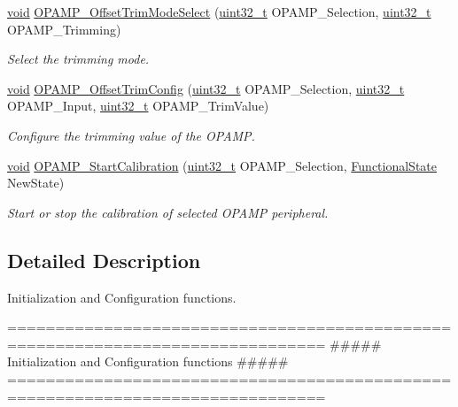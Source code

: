 \begin{DoxyCompactItemize}
\hyperlink{group___n_a_m_e_ga18028b8badbf1ea7e704ccac3c488e82}{void} \hyperlink{group___o_p_a_m_p___group1_ga3d67a254b057003e947137b48a61e2db}{O\-P\-A\-M\-P\-\_\-\-Offset\-Trim\-Mode\-Select} (\hyperlink{stdint_8h_a435d1572bf3f880d55459d9805097f62}{uint32\-\_\-t} O\-P\-A\-M\-P\-\_\-\-Selection, \hyperlink{stdint_8h_a435d1572bf3f880d55459d9805097f62}{uint32\-\_\-t} O\-P\-A\-M\-P\-\_\-\-Trimming)
\begin{DoxyCompactList}\small\item\em Select the trimming mode. \end{DoxyCompactList}\item 
\hyperlink{group___n_a_m_e_ga18028b8badbf1ea7e704ccac3c488e82}{void} \hyperlink{group___o_p_a_m_p___group1_gaadd8bba707d7641bbf42da7f5b7ad64b}{O\-P\-A\-M\-P\-\_\-\-Offset\-Trim\-Config} (\hyperlink{stdint_8h_a435d1572bf3f880d55459d9805097f62}{uint32\-\_\-t} O\-P\-A\-M\-P\-\_\-\-Selection, \hyperlink{stdint_8h_a435d1572bf3f880d55459d9805097f62}{uint32\-\_\-t} O\-P\-A\-M\-P\-\_\-\-Input, \hyperlink{stdint_8h_a435d1572bf3f880d55459d9805097f62}{uint32\-\_\-t} O\-P\-A\-M\-P\-\_\-\-Trim\-Value)
\begin{DoxyCompactList}\small\item\em Configure the trimming value of the O\-P\-A\-M\-P. \end{DoxyCompactList}\item 
\hyperlink{group___n_a_m_e_ga18028b8badbf1ea7e704ccac3c488e82}{void} \hyperlink{group___o_p_a_m_p___group1_ga79a02d17e67866e3dc85f0cab0cbae3a}{O\-P\-A\-M\-P\-\_\-\-Start\-Calibration} (\hyperlink{stdint_8h_a435d1572bf3f880d55459d9805097f62}{uint32\-\_\-t} O\-P\-A\-M\-P\-\_\-\-Selection, \hyperlink{group___exported__types_gac9a7e9a35d2513ec15c3b537aaa4fba1}{Functional\-State} New\-State)
\begin{DoxyCompactList}\small\item\em Start or stop the calibration of selected O\-P\-A\-M\-P peripheral. \end{DoxyCompactList}\end{DoxyCompactItemize}


\subsection{Detailed Description}
Initialization and Configuration functions. \begin{DoxyVerb} ===============================================================================
             ##### Initialization and Configuration functions #####
 ===============================================================================  \end{DoxyVerb}
 

